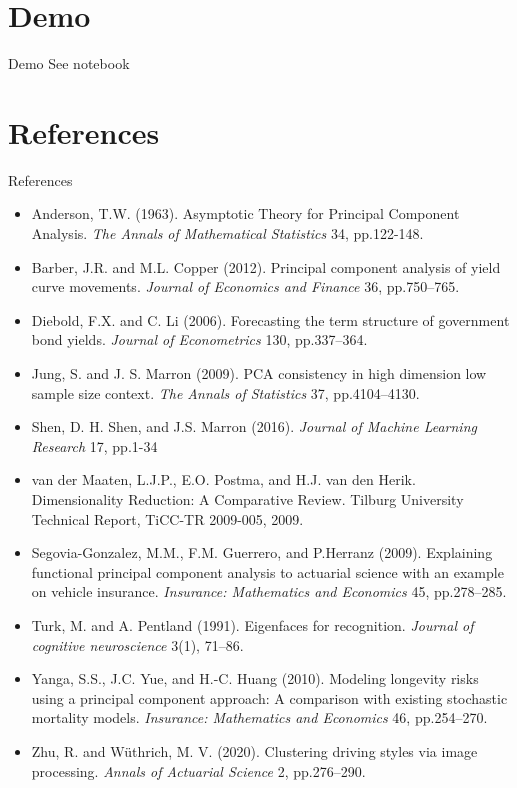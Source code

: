 \documentclass[pdf, handout]{beamer}
\begin{document}
\section{Demo}

\begin{frame}{Demo}
See notebook
\end{frame}


\section{References}


\begin{frame}{References}
\tiny
\begin{itemize}
\item Anderson, T.W. (1963). 
Asymptotic Theory for Principal Component Analysis.
\emph{The Annals of Mathematical Statistics} 34, pp.122-148.
\item Barber, J.R. and M.L. Copper (2012).
Principal component analysis of yield
curve movements. \emph{Journal of Economics and Finance} 36, pp.750--765.
\item Diebold, F.X. and C. Li (2006). 
Forecasting the term structure of government
bond yields. \emph{Journal of Econometrics} 130, pp.337--364.
\item 
Jung, S. and J. S. Marron (2009). PCA consistency in high dimension low sample
size context. \emph{The Annals of Statistics} 37, pp.4104--4130.
\item Shen, D. H. Shen, and J.S. Marron (2016). \emph{Journal of Machine Learning Research} 17, pp.1-34
\item van der Maaten, L.J.P., E.O. Postma, and H.J. van den Herik. Dimensionality Reduction: A Comparative Review. Tilburg University Technical Report, TiCC-TR 2009-005, 2009.
\item 
Segovia-Gonzalez, M.M., F.M. Guerrero, and P.Herranz (2009).
Explaining functional principal component analysis to actuarial science with an example on vehicle insurance.
\emph{Insurance: Mathematics and Economics} 45, pp.278--285.
\item Turk, M. and A. Pentland (1991). Eigenfaces for recognition. \emph{Journal of cognitive neuroscience} 3(1), 71--86.
\item
Yanga, S.S., J.C. Yue, and H.-C. Huang (2010). Modeling longevity risks using a principal component approach: A comparison with existing stochastic mortality models.
\emph{Insurance: Mathematics and Economics} 46, pp.254--270.
\item 
Zhu, R. and W\"{u}thrich, M. V. (2020). Clustering driving styles via image processing.
\emph{Annals of Actuarial Science} 2, pp.276--290. 
\end{itemize}
\end{frame}
\end{document}
